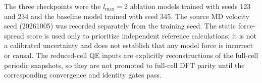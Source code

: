 The three checkpoints were the $l_{\max}=2$ ablation models trained with seeds
123 and 234 and the baseline model trained with seed 345. The source MD
velocity seed (20261005) was recorded separately from the training seed. The
static force-spread score is used only to prioritize independent reference
calculations; it is not a calibrated uncertainty and does not establish that
any model force is incorrect or causal. The reduced-cell QE inputs are
explicitly reconstructions of the full-cell periodic snapshots, so they are
not promoted to full-cell DFT parity until the corresponding convergence and
identity gates pass.
